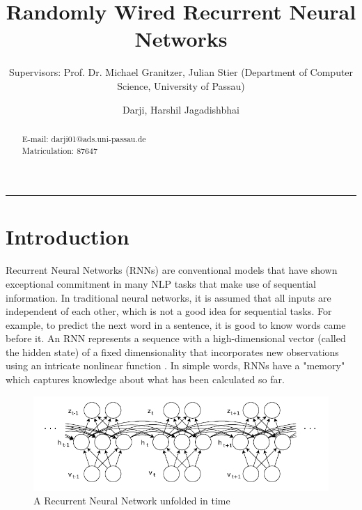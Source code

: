 \documentclass[acmlarge,screen,natbib=false]{acmart}
\begin{document}
\title{Randomly Wired Recurrent Neural Networks}
\subtitle{Supervisors: Prof. Dr. Michael Granitzer, Julian Stier (Department of Computer Science, University of Passau)}

\author{Darji, Harshil Jagadishbhai}

\makeatletter
\let\@authorsaddresses\@empty
\makeatother

\begin{abstract}
E-mail: darji01@ads.uni-passau.de\\
Matriculation: 87647
\vspace*{-2.4mm}
\end{abstract}

\fancyfoot{}
\maketitle
\thispagestyle{empty}
\noindent\rule{12cm}{0.4pt}

\section{Introduction}
Recurrent Neural Networks (RNNs) are conventional models that have shown exceptional commitment in many NLP tasks that make use of sequential information. In traditional neural networks, it is assumed that all inputs are independent of each other, which is not a good idea for sequential tasks. For example, to predict the next word in a sentence, it is good to know words came before it. An RNN represents a sequence with a high-dimensional vector (called the hidden state) of a fixed dimensionality that incorporates new observations using an intricate nonlinear function \cite{is-phd-thesis}. In simple words, RNNs have a "memory" which captures knowledge about what has been calculated so far.

\begin{figure}[h!]
  \includegraphics[scale=0.5]{rnn.png}
  \caption{A Recurrent Neural Network unfolded in time \cite{is-phd-thesis}}
  \label{fig:rnn}
\end{figure}
\end{document}
